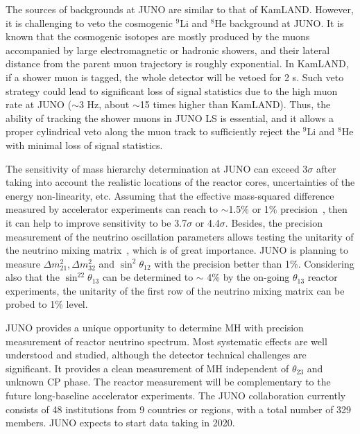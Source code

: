 
The sources of backgrounds at JUNO are similar to that of KamLAND. However, it is challenging to veto the cosmogenic $^9$Li and $^8$He background at JUNO. It is known that the cosmogenic isotopes are mostly produced by the muons accompanied by large electromagnetic or hadronic showers, and their lateral distance from the parent muon trajectory is roughly exponential. In KamLAND, if a shower muon is tagged, the whole detector will be vetoed for 2 s. Such veto strategy could lead to significant loss of signal statistics due to the high muon rate at JUNO ($\sim$3 Hz, about $\sim$15 times higher than KamLAND). Thus, the ability of tracking the shower muons in JUNO LS is essential, and it allows a proper cylindrical veto along the muon track to sufficiently reject the $^9$Li and $^8$He with minimal loss of signal statistics.

The sensitivity of mass hierarchy determination at JUNO can exceed 3$\sigma$ after taking into account the realistic locations of the reactor cores, uncertainties of the energy non-linearity, etc. Assuming that the effective mass-squared difference measured by accelerator experiments can reach to $\sim$1.5\% or 1\% precision~\cite{Agarwalla}, then it can help to improve sensitivity to be 3.7$\sigma$ or 4.4$\sigma$\cite{Li-PRD13}. Besides, the precision measurement of the neutrino oscillation parameters allows testing the unitarity of the neutrino mixing matrix~\cite{unitarity13}, which is of great importance. JUNO is planning to measure $\Delta m^2_{21}, \Delta m^2_{32}$ and $\sin^2 \theta_{12}$ with the precision better than 1\%.
Considering also that the $\sin^22\theta_{13}$ can be determined to $\sim$ 4\% by the on-going $\theta_{13}$ reactor experiments, the unitarity of the first row of the neutrino mixing matrix can be probed to 1\% level.

JUNO provides a unique opportunity to determine MH with precision measurement of reactor neutrino spectrum. Most systematic effects are well understood and studied, although the detector technical challenges are significant. It provides a clean measurement of MH independent of $\theta_{23}$ and unknown CP phase. The reactor measurement will be complementary to the future long-baseline accelerator experiments. The JUNO collaboration currently consists of 48 institutions from 9 countries or regions, with a total number of 329 members. JUNO expects to start data taking in 2020.

